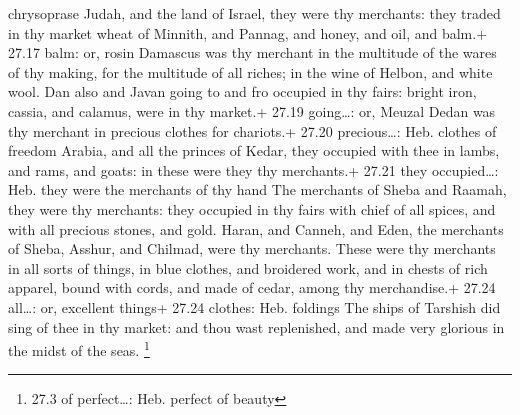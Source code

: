 chrysoprase  Judah, and the land of Israel, they were thy
merchants: they traded in thy market wheat of Minnith, and Pannag, and
honey, and oil, and balm.+ 27.17 balm: or, rosin  Damascus
was thy merchant in the multitude of the wares of thy making, for the
multitude of all riches; in the wine of Helbon, and white wool.
 Dan also and Javan going to and fro occupied in thy fairs:
bright iron, cassia, and calamus, were in thy market.+ 27.19
going\ldots: or, Meuzal  Dedan was thy merchant in precious
clothes for chariots.+ 27.20 precious\ldots: Heb. clothes of freedom
 Arabia, and all the princes of Kedar, they occupied with
thee in lambs, and rams, and goats: in these were they thy merchants.+
27.21 they occupied\ldots: Heb. they were the merchants of thy hand
 The merchants of Sheba and Raamah, they were thy
merchants: they occupied in thy fairs with chief of all spices, and with
all precious stones, and gold.  Haran, and Canneh, and
Eden, the merchants of Sheba, Asshur, and Chilmad, were thy merchants.
 These were thy merchants in all sorts of things, in blue
clothes, and broidered work, and in chests of rich apparel, bound with
cords, and made of cedar, among thy merchandise.+ 27.24 all\ldots: or,
excellent things+ 27.24 clothes: Heb. foldings  The ships
of Tarshish did sing of thee in thy market: and thou wast replenished,
and made very glorious in the midst of the seas. \footnote{27.3 of
  perfect\ldots: Heb. perfect of beauty}

